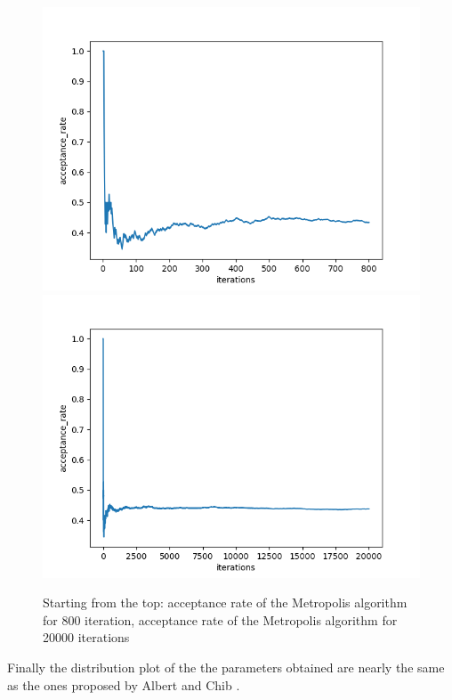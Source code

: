\documentclass{article}
\begin{document}
\begin{figure}[htp]
    \centering
    \includegraphics[scale=0.6]{images/ar_metropolis_noinfo_800_warmup_0.png}
    \includegraphics[scale=0.6]{images/ar_metropolis_noinfo_20000_warmup_0.png}
    \caption{Starting from the top: acceptance rate of the Metropolis algorithm for 800 iteration, acceptance rate of the Metropolis algorithm for 20000 iterations}
    \label{fig:ar}
\end{figure}
Finally the distribution plot of the the parameters obtained are nearly the same as the ones proposed by Albert and Chib \cite{albert1993bayesian}. 
\end{document}
